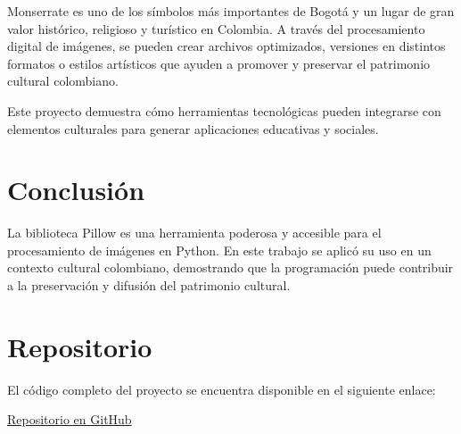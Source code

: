 \documentclass[12pt]{article}
\begin{document}
Monserrate es uno de los símbolos más importantes de Bogotá y un lugar de gran valor histórico, religioso y turístico en Colombia. A través del procesamiento digital de imágenes, se pueden crear archivos optimizados, versiones en distintos formatos o estilos artísticos que ayuden a promover y preservar el patrimonio cultural colombiano.

Este proyecto demuestra cómo herramientas tecnológicas pueden integrarse con elementos culturales para generar aplicaciones educativas y sociales.

\section{Conclusión}

La biblioteca Pillow es una herramienta poderosa y accesible para el procesamiento de imágenes en Python. En este trabajo se aplicó su uso en un contexto cultural colombiano, demostrando que la programación puede contribuir a la preservación y difusión del patrimonio cultural.

\section{Repositorio}

El código completo del proyecto se encuentra disponible en el siguiente enlace:

\href{https://github.com/sebDiav/monserrate-pillow}{Repositorio en GitHub}
\end{document}
